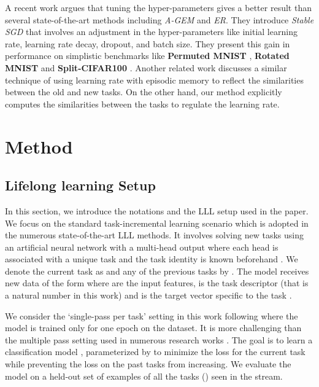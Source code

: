 \documentclass{article} \usepackage{collas2022_conference,times}
\begin{document}
    A recent work \citep{mirzadeh2020understanding} argues that tuning the hyper-parameters gives a better result than several state-of-the-art methods including \textit{A-GEM} and \textit{ER}. They introduce \textit{Stable SGD} that involves an adjustment in the hyper-parameters like initial learning rate, learning rate decay, dropout, and batch size. They present this gain in performance on simplistic benchmarks like \textbf{Permuted MNIST} \citep{goodfellow2013empirical}, \textbf{Rotated MNIST} and \textbf{Split-CIFAR100} \citep{mirzadeh2020understanding}. { Another related work \citep{gupta2020maml} discusses a similar technique of using learning rate with episodic memory to reflect the similarities between the old and new tasks. On the other hand, our method explicitly computes the similarities between the tasks to regulate the learning rate.}




\section{Method}\label{tag_sec}
\subsection{Lifelong learning Setup}

In this section, we introduce the notations and the LLL setup used in the paper. We focus on the standard task-incremental learning scenario which is adopted in the numerous state-of-the-art LLL methods. It involves solving new tasks using an artificial neural network with a multi-head output where each head is associated with a unique task and the task identity is known beforehand \citep{lopez2017gradient,van2019three,delange2021continual}. We denote the current task as  and any of the previous tasks by . The model receives new data of the form  where  are the input features,  is the task descriptor (that is a natural number in this work) and  is the target vector specific to the task .
    
We consider the `single-pass per task' setting in this work following \citep{lopez2017gradient,riemer2018learning,chaudhry2019tiny} where the model is trained only for one epoch on the dataset. It is more challenging than the multiple pass setting used in numerous research works \citep{kirkpatrick2017overcoming,rebuffi2017icarl}. The goal is to learn a classification model , parameterized by  to minimize the loss  for the current task  while preventing the loss on the past tasks from increasing. We evaluate the model on a held-out set of examples of all the tasks () seen in the stream. 
\end{document}
